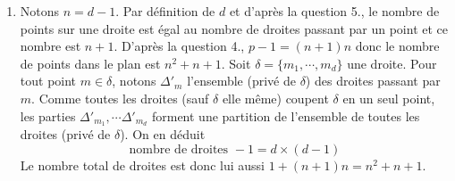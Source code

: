 \begin{enumerate}
 \item Notons $n=d-1$.\newline
Par définition de $d$ et d'après la question 5., le nombre de points sur une droite est égal au nombre de droites passant par un point et ce nombre est $n+1$.\newline
D'après la question 4., $p-1 = (n+1)n$ donc le nombre de points dans le plan est $n^2+n+1$.\newline
Soit $\delta=\{m_1,\cdots,m_d\}$ une droite. Pour tout point $m\in \delta$, notons $\Delta'_m$ l'ensemble (privé de $\delta$) des droites passant par $m$.  Comme toutes les droites (sauf $\delta$ elle même) coupent $\delta$ en un seul point, les parties $\Delta'_{m_1},\cdots \Delta'_{m_d}$ forment une partition de l'ensemble de toutes les droites (privé de $\delta$). On en déduit 
\begin{displaymath}
 \text{nombre de droites } - 1 = d\times (d-1)
\end{displaymath}
Le nombre total de droites est donc lui aussi $1+(n+1)n=n^2+n+1$.
\end{enumerate}
